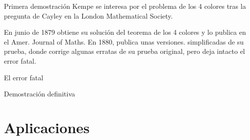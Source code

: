 \documentclass[spanish,utf8]{beamer}
\begin{document}
\begin{frame}{\insertsection}
\begin{block}{Primera demostración}
Kempe se interesa por el problema de los 4 colores tras la pregunta de Cayley en la London Mathematical Society.
\end{block}

\begin{block}{}
En junio de 1879 obtiene su solución del teorema de los 4 colores y lo publica en el Amer. Journal of Maths. En 1880, publica unas versiones. simplificadas de su prueba, donde corrige algunas erratas de su prueba original, pero deja intacto el error fatal.
\end{block}
    \end{frame}

\begin{frame}{\insertsection}
El error fatal
\end{frame}

\begin{frame}{\insertsection}
Demostración definitiva
\end{frame}

\section{Aplicaciones}
\begin{frame}{\insertsection}

\end{frame}
\end{document}
